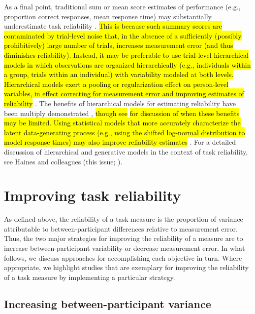 \documentclass[a4paper,12pt]{article}
\begin{document}
As a final point, traditional sum or mean score estimates of performance (e.g., proportion correct responses, mean response time) may substantially underestimate task reliability \cite{Rouder2019-am, haines2020learning, chen2021trial}. \hl{This is because such summary scores are contaminated by trial-level noise that, in the absence of a sufficiently (possibly prohibitively) large number of trials, increases measurement error (and thus diminishes reliability). Instead, it may be preferable to use trial-level hierarchical models in which observations are organized hierarchically (e.g., individuals within a group, trials within an individual) with variability modeled at both levels. Hierarchical models exert a pooling or regularization effect on person-level variables, in effect correcting for measurement error and improving estimates of reliability} \cite{Rouder2019-am, haines2020learning, chen2021trial}. The benefits of hierarchical models for estimating reliability have been multiply demonstrated \cite{snijder2022psychometric, sullivan2022enhancing, brown2020improving, waltmann2022sufficient}, \hl{though see} \cite{rouder2019most} \hl{for discussion of when these benefits may be limited. Using statistical models that more accurately characterize the latent data-generating process (e.g., using the shifted log-normal distribution to model response times) may also improve reliability estimates} \cite{haines2020learning, price2019computational}. For a detailed discussion of hierarchical and generative models in the context of task reliability, see Haines and colleagues (this issue; \cite{haines2020learning}).

\section{Improving task reliability}

As defined above, the reliability of a task measure is the proportion of variance attributable to between-participant differences relative to measurement error. Thus, the two major strategies for improving the reliability of a measure are to increase between-participant variability or decrease measurement error. In what follows, we discuss approaches for accomplishing each objective in turn. Where appropriate, we highlight studies that are exemplary for improving the reliability of a task measure by implementing a particular strategy. 

\subsection{Increasing between-participant variance}
\end{document}
